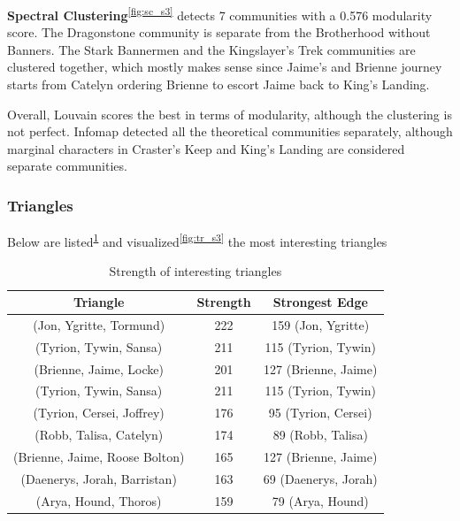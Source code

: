 \documentclass[10pt,twocolumn,letterpaper]{article}
\begin{document}
\textbf{Spectral Clustering}\textsuperscript{\ref{fig:sc_s3}} detects 7 communities with a 0.576 modularity score. The Dragonstone community is separate from the Brotherhood without Banners. The Stark Bannermen and the Kingslayer's Trek communities are clustered together, which mostly makes sense since Jaime's and Brienne journey starts from Catelyn ordering Brienne to escort Jaime back to King's Landing.

Overall, Louvain scores the best in terms of modularity, although the clustering is not perfect. Infomap detected all the theoretical communities separately, although marginal characters in Craster's Keep and King's Landing are considered separate communities.

\subsubsection{Triangles}

Below are listed\textsuperscript{\ref{tab:tr_s3}} and visualized\textsuperscript{\ref{fig:tr_s3}}  the most interesting triangles

\begin{table}[h!]
    \centering
    \small
    \begin{tabular}{c|c|c}
        Triangle & Strength & Strongest Edge  \\
        \hline
        \small{(Jon, Ygritte, Tormund)} & 222 & 159 \small{(Jon, Ygritte)} \\
        \small{(Tyrion, Tywin, Sansa)} & 211 & 115 \small{(Tyrion, Tywin)}\\
        \small{(Brienne, Jaime, Locke)} & 201 & 127 \small{(Brienne, Jaime)}\\
        \small{(Tyrion, Tywin, Sansa)} & 211 & 115 \small{(Tyrion, Tywin)}\\
        \small{(Tyrion, Cersei, Joffrey)} & 176 & 95 \small{(Tyrion, Cersei)}\\
        \small{(Robb, Talisa, Catelyn)} & 174 & 89 \small{(Robb, Talisa)}\\
        \small{(Brienne, Jaime, Roose Bolton)} & 165 & 127 \small{(Brienne, Jaime)}\\
        \small{(Daenerys, Jorah, Barristan)} & 163 & 69 \small{(Daenerys, Jorah)}\\
        \small{(Arya, Hound, Thoros)} & 159 & 79 \small{(Arya, Hound)}\\
        \hline 
    \end{tabular} \\
    \vspace{0.2cm}
    \caption{Strength of interesting triangles}
    \label{tab:tr_s3}
\end{table}
\end{document}
